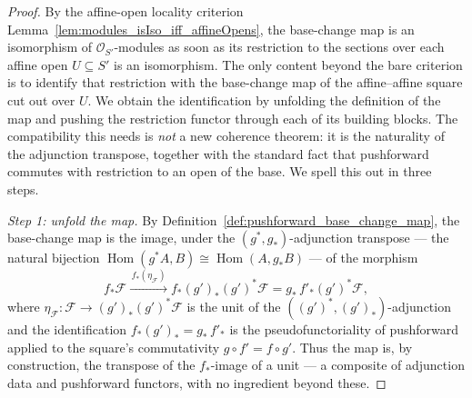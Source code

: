 \begin{proof}
  By the affine-open locality criterion
  Lemma~\ref{lem:modules_isIso_iff_affineOpens}, the base-change map is an isomorphism
  of \(\mathcal{O}_{S'}\)-modules as soon as its restriction to the sections over each
  affine open \(U \subseteq S'\) is an isomorphism. The only content beyond the bare criterion is to identify that
  restriction with the base-change map of the affine--affine square cut out over
  \(U\). We obtain the identification by unfolding the definition of the map and
  pushing the restriction functor through each of its building blocks. The
  compatibility this needs is \emph{not} a new coherence theorem: it is the naturality
  of the adjunction transpose, together with the standard fact that pushforward
  commutes with restriction to an open of the base. We spell this out in three steps.

  \medskip
  \emph{Step 1: unfold the map.} By
  Definition~\ref{def:pushforward_base_change_map}, the base-change map is the image,
  under the \((g^*, g_*)\)-adjunction transpose — the natural bijection
  \(\operatorname{Hom}(g^*A, B) \cong \operatorname{Hom}(A, g_*B)\) — of the morphism
  \[
    f_*\mathcal{F} \xrightarrow{\,f_*(\eta_{\mathcal{F}})\,}
    f_*(g')_*(g')^*\mathcal{F} = g_*\,f'_*(g')^*\mathcal{F},
  \]
  where \(\eta_{\mathcal{F}} : \mathcal{F} \to (g')_*(g')^*\mathcal{F}\) is the unit of
  the \(((g')^*, (g')_*)\)-adjunction and the identification
  \(f_*(g')_* = g_*\,f'_*\) is the pseudofunctoriality of pushforward applied to the
  square's commutativity \(g \circ f' = f \circ g'\). Thus the map is, by
  construction, the transpose of the \(f_*\)-image of a unit — a composite of
  adjunction data and pushforward functors, with no ingredient beyond these.


\end{proof}
